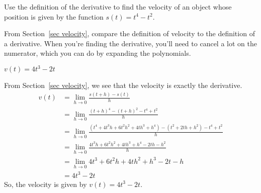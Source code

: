 \begin{question} Use the definition of the derivative to find the velocity of an object whose position is given by the function $s(t)=t^4-t^2$.
\end{question}
\begin{hint} From Section~\ref*{sec velocity}, %
compare the definition of velocity to the definition of a derivative. When you're finding the derivative, you'll need to cancel a lot on the numerator, which you can do by expanding the polynomials.
\end{hint}
\begin{answer} $v(t)=4t^3-2t$
\end{answer}
\begin{solution}
From Section~\ref*{sec velocity}, %
we see that the velocity is exactly the derivative.
\begin{align*}
v(t)&=\lim_{h \rightarrow 0}\frac{s(t+h)-s(t)}{h}\\
&=\lim_{h \rightarrow 0}\frac{(t+h)^4-(t+h)^2-t^4+t^2}{h}\\
&=\lim_{h \rightarrow 0}\frac{(t^4+4t^3h+6t^2h^2+4th^3+h^4)-(t^2+2th+h^2)-t^4+t^2}{h}
\\
&=\lim_{h \rightarrow 0}\frac{4t^3h+6t^2h^2+4th^3+h^4-2th-h^2}{h}
\\
&=\lim_{h \rightarrow 0}4t^3+6t^2h+4th^2+h^3-2t-h\\
&=4t^3-2t
\end{align*}
So, the velocity is given by $v(t)=4t^3-2t$.
\end{solution}


